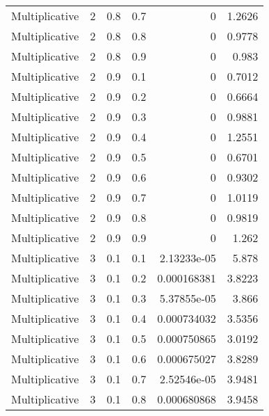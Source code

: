 \documentclass{article}
\begin{document}
\begin{longtable}[H]{lrrrrr}
 Multiplicative &       2 &   0.8 &            0.7 &      0           &          1.2626 \\
 Multiplicative &       2 &   0.8 &            0.8 &      0           &          0.9778 \\
 Multiplicative &       2 &   0.8 &            0.9 &      0           &          0.983  \\
 Multiplicative &       2 &   0.9 &            0.1 &      0           &          0.7012 \\
 Multiplicative &       2 &   0.9 &            0.2 &      0           &          0.6664 \\
 Multiplicative &       2 &   0.9 &            0.3 &      0           &          0.9881 \\
 Multiplicative &       2 &   0.9 &            0.4 &      0           &          1.2551 \\
 Multiplicative &       2 &   0.9 &            0.5 &      0           &          0.6701 \\
 Multiplicative &       2 &   0.9 &            0.6 &      0           &          0.9302 \\
 Multiplicative &       2 &   0.9 &            0.7 &      0           &          1.0119 \\
 Multiplicative &       2 &   0.9 &            0.8 &      0           &          0.9819 \\
 Multiplicative &       2 &   0.9 &            0.9 &      0           &          1.262  \\
 Multiplicative &       3 &   0.1 &            0.1 &      2.13233e-05 &          5.878  \\
 Multiplicative &       3 &   0.1 &            0.2 &      0.000168381 &          3.8223 \\
 Multiplicative &       3 &   0.1 &            0.3 &      5.37855e-05 &          3.866  \\
 Multiplicative &       3 &   0.1 &            0.4 &      0.000734032 &          3.5356 \\
 Multiplicative &       3 &   0.1 &            0.5 &      0.000750865 &          3.0192 \\
 Multiplicative &       3 &   0.1 &            0.6 &      0.000675027 &          3.8289 \\
 Multiplicative &       3 &   0.1 &            0.7 &      2.52546e-05 &          3.9481 \\
 Multiplicative &       3 &   0.1 &            0.8 &      0.000680868 &          3.9458 \\

\end{longtable}
\end{document}
